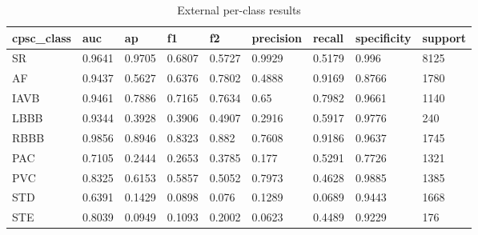 \begin{table}[htbp]\centering\small
\caption{External per-class results}\label{tab:extperclass}
\begin{tabular}{lllllllll}
\hline
cpsc_class & auc & ap & f1 & f2 & precision & recall & specificity & support \\
\hline
SR & 0.9641 & 0.9705 & 0.6807 & 0.5727 & 0.9929 & 0.5179 & 0.996 & 8125 \\
AF & 0.9437 & 0.5627 & 0.6376 & 0.7802 & 0.4888 & 0.9169 & 0.8766 & 1780 \\
IAVB & 0.9461 & 0.7886 & 0.7165 & 0.7634 & 0.65 & 0.7982 & 0.9661 & 1140 \\
LBBB & 0.9344 & 0.3928 & 0.3906 & 0.4907 & 0.2916 & 0.5917 & 0.9776 & 240 \\
RBBB & 0.9856 & 0.8946 & 0.8323 & 0.882 & 0.7608 & 0.9186 & 0.9637 & 1745 \\
PAC & 0.7105 & 0.2444 & 0.2653 & 0.3785 & 0.177 & 0.5291 & 0.7726 & 1321 \\
PVC & 0.8325 & 0.6153 & 0.5857 & 0.5052 & 0.7973 & 0.4628 & 0.9885 & 1385 \\
STD & 0.6391 & 0.1429 & 0.0898 & 0.076 & 0.1289 & 0.0689 & 0.9443 & 1668 \\
STE & 0.8039 & 0.0949 & 0.1093 & 0.2002 & 0.0623 & 0.4489 & 0.9229 & 176 \\
\hline
\end{tabular}
\end{table}
